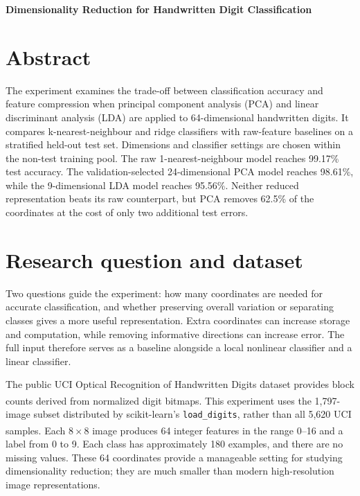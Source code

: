 \documentclass[11pt,a4paper]{article}
\newcommand{\supcite}[1]{\textsuperscript{\cite{#1}}}
\begin{document}
\begin{center}
{\LARGE\bfseries\color{titleblue} Dimensionality Reduction for Handwritten Digit Classification\par}
\end{center}
\vspace{0.4em}

\section*{Abstract}

The experiment examines the trade-off between classification accuracy and feature compression when principal component analysis (PCA) and linear discriminant analysis (LDA) are applied to 64-dimensional handwritten digits. It compares k-nearest-neighbour and ridge classifiers with raw-feature baselines on a stratified held-out test set. Dimensions and classifier settings are chosen within the non-test training pool. The raw 1-nearest-neighbour model reaches 99.17\% test accuracy. The validation-selected 24-dimensional PCA model reaches 98.61\%, while the 9-dimensional LDA model reaches 95.56\%. Neither reduced representation beats its raw counterpart, but PCA removes 62.5\% of the coordinates at the cost of only two additional test errors.

\section{Research question and dataset}

Two questions guide the experiment: how many coordinates are needed for accurate classification, and whether preserving overall variation or separating classes gives a more useful representation. Extra coordinates can increase storage and computation, while removing informative directions can increase error. The full input therefore serves as a baseline alongside a local nonlinear classifier and a linear classifier.

The public UCI Optical Recognition of Handwritten Digits dataset provides block counts derived from normalized digit bitmaps.\supcite{alpaydin} This experiment uses the 1,797-image subset distributed by scikit-learn's \texttt{load\_digits}, rather than all 5,620 UCI samples.\supcite{load_digits} Each $8 \times 8$ image produces 64 integer features in the range 0--16 and a label from 0 to 9. Each class has approximately 180 examples, and there are no missing values. These 64 coordinates provide a manageable setting for studying dimensionality reduction; they are much smaller than modern high-resolution image representations.
\end{document}
